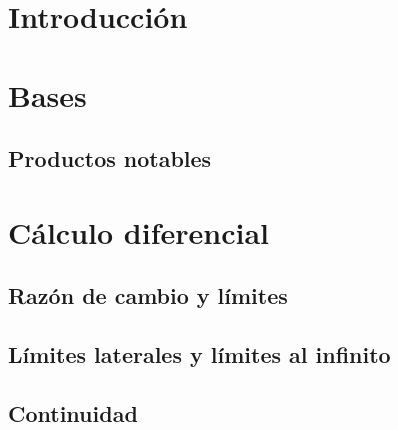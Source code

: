 \documentclass[12pt]{article}
\begin{document}
\section{Introducción}

\section{Bases}

\subsection{Productos notables}

\section{Cálculo diferencial}

\subsection{Razón de cambio y límites}

\subsection{Límites laterales y límites al infinito}

\subsection{Continuidad}
\end{document}
